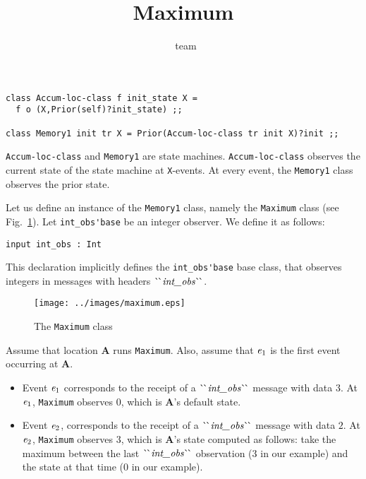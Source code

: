 \documentclass[final]{article}
\title{Maximum}
\author{\prl\ team}
\begin{document}
\maketitle



\begin{emlcode}
\begin{lstlisting}
class Accum-loc-class f init_state X =
  f o (X,Prior(self)?init_state) ;;

class Memory1 init tr X = Prior(Accum-loc-class tr init X)?init ;;
\end{lstlisting}
\end{emlcode}

\lstinline{Accum-loc-class} and \lstinline{Memory1} are state
machines.
%
\lstinline{Accum-loc-class} observes the current state of the state
machine at \lstinline{X}-events.
%
At every event, the \lstinline{Memory1} class observes the prior
state.


Let us define an instance of the \lstinline{Memory1} class, namely the
\lstinline{Maximum} class (see Fig.~\ref{fig:maximum}).  Let
\lstinline{int_obs'base} be an integer observer.  We define it as
follows:
\begin{emlcode}
\begin{lstlisting}
input int_obs : Int
\end{lstlisting}
\end{emlcode}
This declaration implicitly defines the \lstinline{int_obs'base} base
class, that observes integers in messages with headers
$\CONSatoms{int\_obs}$.

\begin{figure}[!h]
  \begin{center}
    \texttt{[image: ../images/maximum.eps]}
  \end{center}
  \caption{The \lstinline{Maximum} class}
  \label{fig:maximum}
 \end{figure}

Assume that location \textbf{A} runs \lstinline{Maximum}.  Also,
assume that $\mathit{e}_1$ is the first event occurring at
\textbf{A}.
\begin{itemize}
\item Event $\mathit{e}_1$ corresponds to the receipt of a
  $\CONSatoms{int\_obs}$ message with data $3$.  At $\mathit{e}_1$,
  \lstinline{Maximum} observes $0$, which is \textbf{A}'s default
  state.
\item Event $\mathit{e}_2$, corresponds to the receipt of a
  $\CONSatoms{int\_obs}$ message with data $2$.  At $\mathit{e}_2$,
  \lstinline{Maximum} observes $3$, which is \textbf{A}'s state
  computed as follows: take the maximum between the last
  $\CONSatoms{int\_obs}$ observation ($3$ in our example) and the
  state at that time ($0$ in our example).
\end{itemize}
\end{document}
